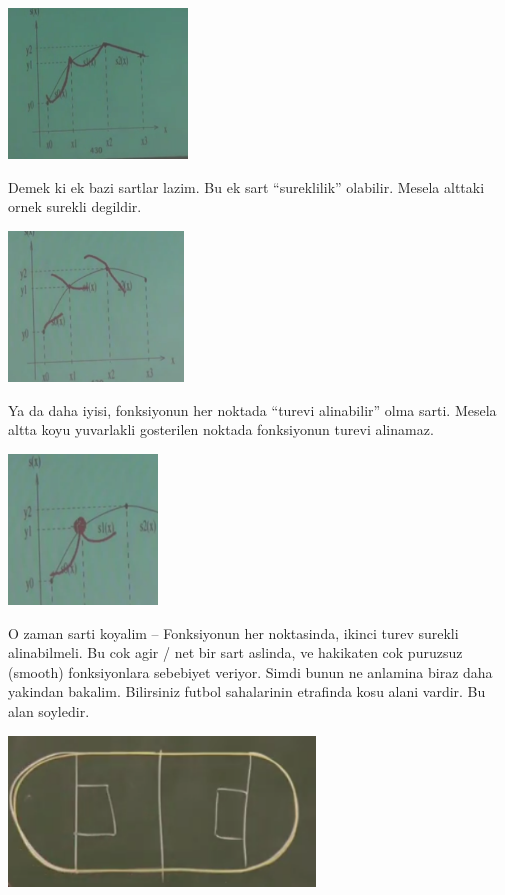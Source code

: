 \documentclass[12pt,fleqn]{article}\usepackage{common}
\begin{document}
\includegraphics[height=4cm]{spline3.png}

Demek ki ek bazi sartlar lazim. Bu ek sart ``sureklilik'' olabilir. Mesela
alttaki ornek surekli degildir.

\includegraphics[height=4cm]{spline5.png}

Ya da daha iyisi, fonksiyonun her noktada ``turevi alinabilir'' olma
sarti. Mesela altta koyu yuvarlakli gosterilen noktada fonksiyonun turevi
alinamaz.

\includegraphics[height=4cm]{spline4.png}

O zaman sarti koyalim -- Fonksiyonun her noktasinda, ikinci turev surekli
alinabilmeli. Bu cok agir / net bir sart aslinda, ve hakikaten cok puruzsuz
(smooth) fonksiyonlara sebebiyet veriyor. Simdi bunun ne anlamina biraz
daha yakindan bakalim. Bilirsiniz futbol sahalarinin etrafinda kosu alani
vardir. Bu alan soyledir.

\includegraphics[height=4cm]{spline6.png}
\end{document}
